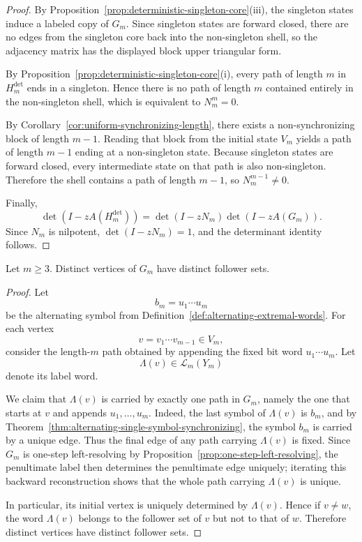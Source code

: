 \begin{proof}
By Proposition~\ref{prop:deterministic-singleton-core}\textup{(iii)}, the
singleton states induce a labeled copy of $G_m$.  Since singleton states are
forward closed, there are no edges from the singleton core back into the
non-singleton shell, so the adjacency matrix has the displayed block upper
triangular form.

By Proposition~\ref{prop:deterministic-singleton-core}\textup{(i)}, every path
of length $m$ in $H_m^{\mathrm{det}}$ ends in a singleton.  Hence there is no
path of length $m$ contained entirely in the non-singleton shell, which is
equivalent to $N_m^m=0$.

By Corollary~\ref{cor:uniform-synchronizing-length}, there exists a
non-synchronizing block of length $m-1$.  Reading that block from the initial
state $V_m$ yields a path of length $m-1$ ending at a non-singleton state.
Because singleton states are forward closed, every intermediate state on that
path is also non-singleton.  Therefore the shell contains a path of length
$m-1$, so $N_m^{m-1}\neq 0$.

Finally,
\[
\det(I-zA(H_m^{\mathrm{det}}))
=
\det(I-zN_m)\det(I-zA(G_m)).
\]
Since $N_m$ is nilpotent, $\det(I-zN_m)=1$, and the determinant identity
follows.
\end{proof}

\begin{proposition}
\label{prop:G-m-follower-separated}
Let $m\ge 3$.  Distinct vertices of $G_m$ have distinct follower sets.
\end{proposition}

\begin{proof}
Let
\[
b_m=u_1\cdots u_m
\]
be the alternating symbol from
Definition~\ref{def:alternating-extremal-words}.  For each vertex
\[
v=v_1\cdots v_{m-1}\in V_m,
\]
consider the length-$m$ path obtained by appending the fixed bit word
$u_1\cdots u_m$.  Let
\[
\Lambda(v)\in\mathcal L_m(Y_m)
\]
denote its label word.

We claim that $\Lambda(v)$ is carried by exactly one path in $G_m$, namely the
one that starts at $v$ and appends $u_1,\ldots,u_m$.  Indeed, the last symbol
of $\Lambda(v)$ is $b_m$, and by
Theorem~\ref{thm:alternating-single-symbol-synchronizing}, the symbol $b_m$ is
carried by a unique edge.  Thus the final edge of any path carrying
$\Lambda(v)$ is fixed.  Since $G_m$ is one-step left-resolving by
Proposition~\ref{prop:one-step-left-resolving}, the penultimate label then
determines the penultimate edge uniquely; iterating this backward reconstruction
shows that the whole path carrying $\Lambda(v)$ is unique.

In particular, its initial vertex is uniquely determined by $\Lambda(v)$.
Hence if $v\neq w$, the word $\Lambda(v)$ belongs to the follower set of $v$
but not to that of $w$.  Therefore distinct vertices have distinct follower
sets.
\end{proof}

